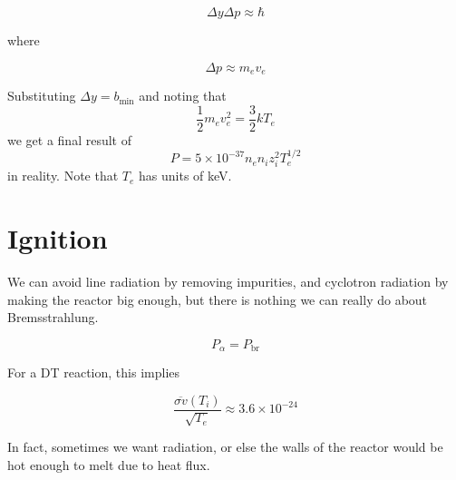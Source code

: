 \documentclass[12pt]{article}
\begin{document}
\begin{equation}
   \Delta y \Delta p \approx \hbar
\end{equation}

where

$$\Delta p \approx m_ev_e$$

Substituting $\Delta y = b_{\text{min}}$ and noting that
$$\frac{1}{2} m_ev_e^2 = \frac{3}{2}kT_e$$
we get a final result of
$$P = 5 \times 10^{-37}n_en_iz_i^2T_e^{1/2}$$
in reality. Note that $T_e$ has units of keV.

\section{Ignition}

We can avoid line radiation by removing impurities, and cyclotron radiation by making the reactor big enough, but there is nothing we can really do about Bremsstrahlung.

\begin{defn}
    $$P_\alpha = P_{\text{br}}$$
\end{defn}

For a DT reaction, this implies

$$\frac{\overline{\sigma v}(T_i)}{\sqrt{T_e}} \approx 3.6 \times 10^{-24}$$

In fact, sometimes we want radiation, or else the walls of the reactor would be hot enough to melt due to heat flux.
\end{document}

